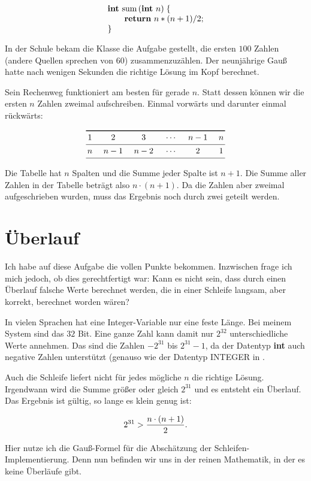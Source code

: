 $$\vbox{\halign{#\hfil\cr
{\bf int} sum$\,(${\bf int} $n)\;\{$\cr
\qquad{\bf return} $n * (n + 1) / 2$;\cr
$\}$\cr}}$$

\noindent In der Schule bekam die Klasse die Aufgabe gestellt, die ersten $100$ Zahlen
(andere Quellen sprechen von $60$) zusammenzuzählen.
Der neunjährige Gauß hatte nach wenigen Sekunden die richtige Lösung im Kopf
berechnet.

Sein Rechenweg funktioniert am besten für gerade $n$.
Statt dessen können wir die ersten $n$ Zahlen zweimal aufschreiben.
Einmal vorwärts und darunter einmal rückwärts:

$$\vbox{\halign{\hfil$\,$#$\,$\hfil&&\quad\hfil$\,$#$\,$\hfil\cr
\noalign{\hrule height1pt\smallskip}
$1$&$2$&$3$&$\mathstrut\cdots$&$n-1$&$n$\cr
\noalign{\smallskip\hrule\smallskip}
$n$&$n-1$&$n-2$&$\mathstrut\cdots$&$2$&$1$\cr
\noalign{\smallskip\hrule}}}$$

\noindent Die Tabelle hat $n$ Spalten und die Summe jeder Spalte ist $n+1$.
Die Summe aller Zahlen in der Tabelle beträgt also $n\cdot(n+1)$.
Da die Zahlen aber zweimal aufgeschrieben wurden, muss das
Ergebnis noch durch zwei geteilt werden.

\section{Überlauf}%
%
Ich habe auf diese Aufgabe die vollen Punkte bekommen.
Inzwischen frage ich mich jedoch, ob dies gerechtfertigt war:
Kann es nicht sein, dass durch einen Überlauf falsche Werte
berechnet werden, die in einer Schleife langsam, aber korrekt,
berechnet worden wären?

In vielen Sprachen hat eine Integer-Variable nur eine feste Länge.
Bei meinem System sind das $32$ Bit.
Eine ganze Zahl kann damit nur $2^{32}$ unterschiedliche Werte annehmen.
Das sind die Zahlen $-2^{31}$ bis $2^{31}-1$, da der Datentyp {\bf int}
auch negative Zahlen unterstützt
(genauso wie der Datentyp {\bsf INTEGER}
in \modula.

Auch die Schleife liefert nicht für jedes mögliche $n$ die richtige Lösung.
Irgendwann wird die Summe größer oder gleich $2^{31}$ und es entsteht ein
Überlauf.
Das Ergebnis ist gültig, so lange es klein genug ist:

$$2^{31} > {n\cdot(n + 1)\over 2}\hbox{.}$$

\noindent Hier nutze ich die Gauß-Formel für die Abschätzung der
Schleifen-Implementierung.
Denn nun befinden wir uns in der reinen Mathematik, in der es keine
Überläufe gibt.

